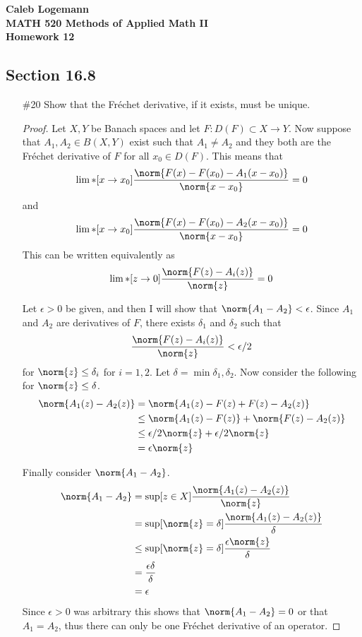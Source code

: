 \documentclass[11pt, oneside]{article}
\begin{document}
\noindent \textbf{\Large{Caleb Logemann \\
MATH 520 Methods of Applied Math II \\
Homework 12
}}

\subsection*{Section 16.8}
\begin{enumerate}
  \item[\#20] %
    Show that the Fr\'echet derivative, if it exists, must be unique.

    \begin{proof}
      Let $X, Y$ be Banach spaces and let $F: D(F) \subset X \to Y$.
      Now suppose that $A_1, A_2 \in B(X, Y)$ exist such that $A_1 \neq A_2$ and
      they both are the Fr\'echet derivative of $F$ for all $x_0 \in D(F)$.
      This means that
      \[
        \lim*[x \to x_0]{\frac{\norm{F(x) - F(x_0) - A_1(x - x_0)}}{\norm{x - x_0}}} = 0
      \]
      and
      \[
        \lim*[x \to x_0]{\frac{\norm{F(x) - F(x_0) - A_2(x - x_0)}}{\norm{x - x_0}}} = 0
      \]
      This can be written equivalently as
      \[
        \lim*[z \to 0]{\frac{\norm{F(z) - A_i(z)}}{\norm{z}}} = 0
      \]

      Let $\epsilon > 0$ be given, and then I will show that
      $\norm{A_1 - A_2} < \epsilon$.
      Since $A_1$ and $A_2$ are derivatives of $F$, there exists $\delta_1$ and
      $\delta_2$ such that
      \[
        \frac{\norm{F(z) - A_i(z)}}{\norm{z}} < \epsilon/2
      \]
      for $\norm{z} \le \delta_i$ for $i = 1, 2$.
      Let $\delta = \min{\delta_1, \delta_2}$.
      Now consider the following for $\norm{z} \le \delta$.
      \begin{align*}
        \norm{A_1(z) - A_2(z)} &= \norm{A_1(z) - F(z) + F(z) - A_2(z)} \\
        &\le \norm{A_1(z) - F(z)} + \norm{F(z) - A_2(z)} \\
        &\le \epsilon/2 \norm{z} + \epsilon/2 \norm{z} \\
        &= \epsilon \norm{z}
      \end{align*}

      Finally consider $\norm{A_1 - A_2}$.
      \begin{align*}
        \norm{A_1 - A_2} &= \sup[z \in X]{\frac{\norm{A_1(z) - A_2(z)}}{\norm{z}}} \\
        &= \sup[\norm{z} = \delta]{\frac{\norm{A_1(z) - A_2(z)}}{\delta}} \\
        &\le \sup[\norm{z} = \delta]{\frac{\epsilon \norm{z}}{\delta}} \\
        &= \frac{\epsilon \delta}{\delta} \\
        &= \epsilon \\
      \end{align*}
      Since $\epsilon > 0$ was arbitrary this shows that $\norm{A_1 - A_2} = 0$
      or that $A_1 = A_2$, thus there can only be one Fr\'echet derivative of
      an operator.
    \end{proof}


\end{enumerate}
\end{document}
